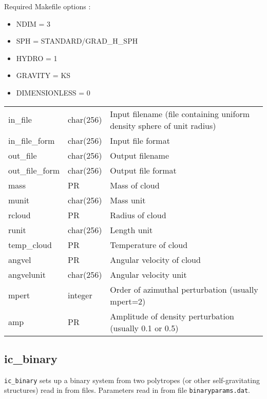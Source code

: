\documentclass[a4paper]{article}
\newcommand{\var}[1]{\texttt{#1}}
\begin{document}
\noindent Required Makefile options :
\begin{itemize}
\item NDIM = 3
\item SPH = STANDARD/GRAD\_H\_SPH
\item HYDRO = 1
\item GRAVITY = KS
\item DIMENSIONLESS = 0
\end{itemize}
\vspace{0.1cm}

\tabletail{\hline}
\tablelasttail{\hline}
\begin{center}
\begin{supertabular}{|p{3cm}|p{2cm}|p{8cm}|}
in\_file         & char(256) & Input filename (file containing uniform density sphere of unit radius) \\
in\_file\_form   & char(256) & Input file format \\
out\_file        & char(256) & Output filename \\
out\_file\_form  & char(256) & Output file format \\
mass             & PR       & Mass of cloud \\
munit            & char(256) & Mass unit \\
rcloud           & PR       & Radius of cloud \\
runit            & char(256) & Length unit \\
temp\_cloud      & PR       & Temperature of cloud \\
angvel           & PR       & Angular velocity of cloud \\
angvelunit       & char(256) & Angular velocity unit \\
mpert            & integer  & Order of azimuthal perturbation (usually mpert=2) \\
amp              & PR       & Amplitude of density perturbation (usually 0.1 or 0.5)\\
\end{supertabular}
\end{center}

\newpage


\subsection{ic\_binary}
\var{ic\_binary} sets up a binary system from two polytropes (or other self-gravitating structures) read in from files.  Parameters read in from file \var{binaryparams.dat}. \newline
\end{document}
